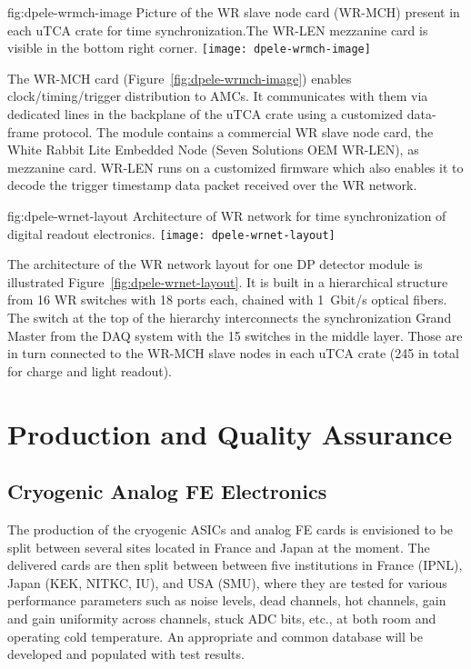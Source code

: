 \begin{dunefigure}{fig:dpele-wrmch-image}
{Picture of the WR slave node card (WR-MCH) present in each uTCA crate for time synchronization.The WR-LEN mezzanine card is visible in the bottom right corner.}
\texttt{[image: dpele-wrmch-image]}
\end{dunefigure}

The WR-MCH card (Figure~\ref{fig:dpele-wrmch-image}) enables clock/timing/trigger distribution to AMCs. It communicates with them via dedicated lines in the backplane of the uTCA crate using a customized data-frame protocol. The module contains a commercial WR slave node card, the White Rabbit Lite Embedded Node (Seven Solutions OEM WR-LEN), as mezzanine card. WR-LEN runs on a customized firmware which also enables it to decode the trigger timestamp data packet received over the WR network.

\begin{dunefigure}{fig:dpele-wrnet-layout}
{Architecture of WR network for time synchronization of digital readout electronics.}
\texttt{[image: dpele-wrnet-layout]}
\end{dunefigure}

The architecture of the WR network layout for one DP detector module is illustrated Figure~\ref{fig:dpele-wrnet-layout}. It is built in a hierarchical structure from \num{16} WR switches with \num{18} ports each,  chained with \SI{1}{Gbit/s} optical fibers. The switch at the top of the hierarchy interconnects the synchronization Grand Master from the DAQ system with the \num{15} switches in the middle layer. Those are in turn connected to the WR-MCH slave nodes in each uTCA crate (245 in total for charge and light readout). 



\section{Production and Quality Assurance}
\label{sec:fddp-tpc-elec-prod-assy}

\subsection{Cryogenic Analog FE Electronics}
\label{sec:fddp-tpc-elec-prod-fe}
The production of the cryogenic ASICs and analog FE cards is envisioned to be split between several sites located in France and Japan at the moment. The delivered cards are then split between between five institutions in France (IPNL), Japan (KEK, NITKC, IU), and USA (SMU), where they are tested for various
performance parameters such as noise levels, dead channels, hot
channels, gain and gain uniformity across channels, stuck ADC bits,
etc., at both room and operating cold temperature. An appropriate
and common database will be developed and populated with test results. 

